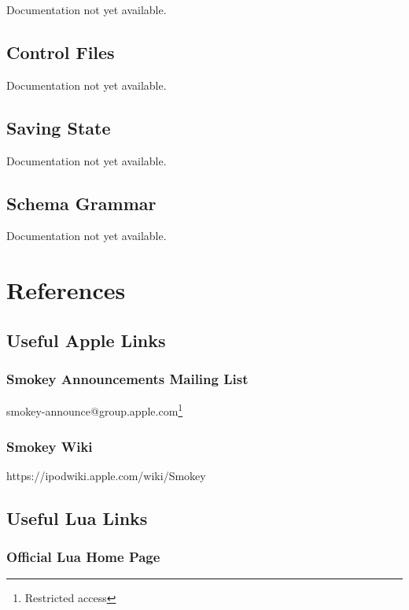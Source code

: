 Documentation not yet available.

\subsection{Control Files}

Documentation not yet available.

\subsection{Saving State}

Documentation not yet available.

\subsection{Schema Grammar}

Documentation not yet available.


\fi

\section{References}

\subsection{Useful Apple Links}
\label{subsec:AppleLinks}

\subsubsection{Smokey Announcements Mailing List}

smokey-announce@group.apple.com\footnote{Restricted access\label{fn:Restricted}}

\subsubsection{Smokey Wiki}

https://ipodwiki.apple.com/wiki/Smokey

\subsection{Useful Lua Links}

\subsubsection{Official Lua Home Page}

